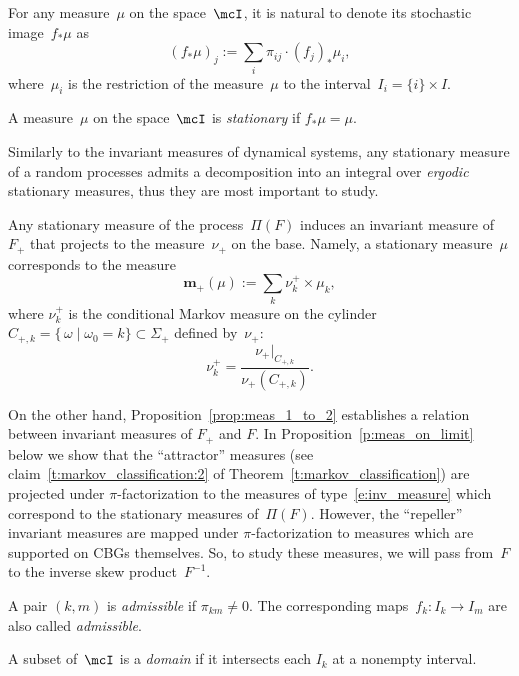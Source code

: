 \documentclass[a4paper,12pt]{amsart}
\begin{document}
For any measure~$\mu$ on the space~$\mcI$, it is natural to denote its stochastic image~$f_* \mu$ as
\begin{equation}\label{e:stoch_img}
  (f_* \mu)_j := \sum_i \pi_{ij} \cdot (f_j)_* \mu_i,
\end{equation}
where~$\mu_i$ is the restriction of the measure~$\mu$ to the interval~$I_i = \{i\} \times I$.

\begin{Def} \label{d:stationary}
A measure~$\mu$ on the space~$\mcI$ is \emph{stationary} if $f_* \mu = \mu$.
\end{Def}

Similarly to the invariant measures of dynamical systems, any stationary measure of a random processes admits a decomposition into an integral over \emph{ergodic} stationary measures, thus they are most important to study.

Any stationary measure of the process~$\Pi(F)$ induces an invariant measure of~$F_+$ that projects to the measure~$\nu_+$ on the base. Namely, a stationary measure~$\mu$ corresponds to the measure
\begin{equation}\label{e:inv_measure}
\mathbf{m}_+ (\mu) := \sum_k \nu_k^+ \times \mu_k,
\end{equation}
where $\nu_k^+$ is the conditional Markov measure on the cylinder $C_{+,k} = \{\, \omega \mid \omega_0 = k \} \subset \Sigma_+$ defined by~$\nu_+$:
$$
\nu_k^+=\frac{\nu_+|_{C_{+,k}}}{\nu_+(C_{+,k})}.
$$

On the other hand, Proposition~\ref{prop:meas_1_to_2} establishes a relation between invariant measures of $F_+$ and $F$. 
In Proposition~\ref{p:meas_on_limit} below we show that the ``attractor'' measures (see claim~\ref{t:markov_classification:2} of Theorem~\ref{t:markov_classification}) are projected under $\pi$-factorization to the measures of type~\eqref{e:inv_measure} which correspond to the stationary measures of~$\Pi(F)$.
However, the ``repeller'' invariant measures are mapped under $\pi$-factorization to measures which are supported on CBGs themselves. So, to study these measures, we will pass from~$F$ to the inverse skew product~$F^{-1}$.

\begin{Def}
A pair $(k,m)$ is \emph{admissible} if $\pi_{km} \neq 0$. The corresponding maps~$f_{k}\colon I_k \to I_m$ are also called \emph{admissible}.
\end{Def}

\begin{Def}
A subset of~$\mcI$ is a \emph{domain} if it intersects each $I_k$ at a nonempty interval.
\end{Def}
\end{document}
